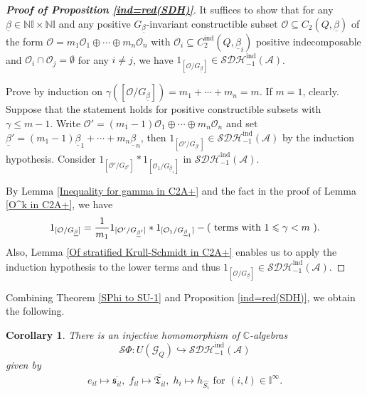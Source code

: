 \documentclass[12pt]{amsart}
\newtheorem{corollary}[theorem]{Corollary}
\theoremstyle{definition}
\numberwithin{equation}{section}
\begin{document}
\begin{proof}[\emph{\textbf{Proof of Proposition \ref{ind=red(SDH)}}}]
    It suffices to show that for any $\underline{\beta} \in \mathbb{N}\mathbb{I} \times \mathbb{N}\mathbb{I} $ and any positive $ G_{\underline{\beta}} $-invariant constructible subset $ \mathcal{O} \subseteq C_2(Q, \underline{\beta}) $ of the form  $ \mathcal{O} = m_1 \mathcal{O}_1 \oplus \cdots \oplus m_n \mathcal{O}_n $ with $ \mathcal{O}_i \subseteq C_2^{\mathrm{ind}}(Q,\underline{\beta}_i) $ positive indecomposable and $ \mathcal{O}_i \cap \mathcal{O}_j = \emptyset $ for any $ i \neq j $, we have $ 1_{[\mathcal{O}/G_{\underline{\beta}}]} \in \mathcal{SDH}^{\mathrm{ind}}_{-1}(\mathcal{A}) $. 

    Prove by induction on $ \gamma([\mathcal{O}/G_{\underline{\beta}}]) = m_1 + \cdots + m_n = m $. 
    If $ m =1 $, clearly. 
    Suppose that the statement holds for positive constructible subsets with $ \gamma \leqslant m-1 $. 
    Write $ \mathcal{O}' = (m_1-1)\mathcal{O}_1 \oplus \cdots \oplus m_n\mathcal{O}_n $ and set $ \underline{\beta}' = (m_1-1)\underline{\beta}_1 + \cdots + m_n \underline{\beta}_n $, then $ 1_{[\mathcal{O}'/G_{\underline{\beta}'}]} \in \mathcal{SDH}^{\mathrm{ind}}_{-1}(\mathcal{A}) $ by the induction hypothesis. 
    Consider $ 1_{[\mathcal{O}'/G_{\underline{\beta}'}]} * 1_{[\mathcal{O}_1/G_{\underline{\beta}_1}]} $ in $  \mathcal{SDH}^{\mathrm{ind}}_{-1}(\mathcal{A}) $. 
    
    By Lemma \ref{Inequality for gamma in C2A+} and the fact in the proof of Lemma \ref{O^k in C2A+}, we have
    \begin{align*}
         1_{[\mathcal{O}/G_{\underline{\beta}}]}= \frac{1}{m_1}{1_{[\mathcal{O}'/G_{\underline{\beta}'}]}} *  1_{[\mathcal{O}_1/G_{\underline{\beta}_1}]} - (\text{ terms with $ 1 \leqslant \gamma <m $ } ).
    \end{align*}
    Also, Lemma \ref{Of stratified Krull-Schmidt in C2A+} enables us to apply the induction hypothesis to the lower terms and thus $ 1_{[\mathcal{O}/G_{\underline{\beta}}]} \in \mathcal{SDH}^{\mathrm{ind}}_{-1}(\mathcal{A}) $. 
    
    

\end{proof}

Combining Theorem \ref{SPhi to SU-1} and Proposition \ref{ind=red(SDH)}, we obtain the following. 
\begin{corollary}
    \label{SPhi to SDHind-1}
    There is an injective homomorphism of $ \mathbb{C} $-algebras
    \[ \mathcal{S}\Phi: U(\mathcal{G}_Q) \hookrightarrow \mathcal{SDH}^{\mathrm{ind}}_{-1}(\mathcal{A}) \]
    given by
    \begin{align*}
        e_{il} \mapsto \overline{\mathfrak{s}_{il}},\; f_{il} \mapsto \overline{\mathfrak{T}_{il}},\; h_i \mapsto h_{\widehat{S_i}} \text{ for } (i,l) \in \mathbb{I}^{\infty}.
    \end{align*}
\end{corollary}



\newpage





\end{document}
